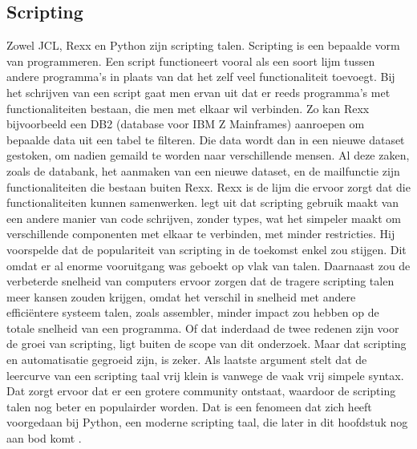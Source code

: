 \subsection{Scripting}
Zowel JCL, Rexx en Python zijn scripting talen. Scripting is een bepaalde vorm van programmeren. Een script functioneert vooral als een soort lijm tussen andere programma’s in plaats van dat het zelf veel functionaliteit toevoegt. Bij het schrijven van een script gaat men ervan uit dat er reeds programma’s met functionaliteiten bestaan, die men met elkaar wil verbinden. Zo kan Rexx bijvoorbeeld een DB2 (database voor IBM Z Mainframes) aanroepen om bepaalde data uit een tabel te filteren. Die data wordt dan in een nieuwe dataset gestoken, om nadien gemaild te worden naar verschillende mensen. Al deze zaken, zoals de databank, het aanmaken van een nieuwe dataset, en de mailfunctie zijn functionaliteiten die bestaan buiten Rexx. Rexx is de lijm die ervoor zorgt dat die functionaliteiten kunnen samenwerken. \textcite{Ousterhout1998} legt uit dat scripting gebruik maakt van een andere manier van code schrijven, zonder types, wat het simpeler maakt om verschillende componenten met elkaar te verbinden, met minder restricties. Hij voorspelde dat de populariteit van scripting in de toekomst enkel zou stijgen. Dit omdat er al enorme vooruitgang was geboekt op vlak van talen. Daarnaast zou de verbeterde snelheid van computers ervoor zorgen dat de tragere scripting talen meer kansen zouden krijgen, omdat het verschil in snelheid met andere efficiëntere systeem talen, zoals assembler, minder impact zou hebben op de totale snelheid van een programma. Of dat inderdaad de twee redenen zijn voor de groei van scripting, ligt buiten de scope van dit onderzoek. Maar dat scripting en automatisatie gegroeid zijn, is zeker. Als laatste argument stelt \textcite{Ousterhout1998} dat de leercurve van een scripting taal vrij klein is vanwege de vaak vrij simpele syntax. Dat zorgt ervoor dat er een grotere community ontstaat, waardoor de scripting talen nog beter en populairder worden. Dat is een fenomeen dat zich heeft voorgedaan bij Python, een moderne scripting taal, die later in dit hoofdstuk nog aan bod komt \autocite{Lindstrom2005}.

